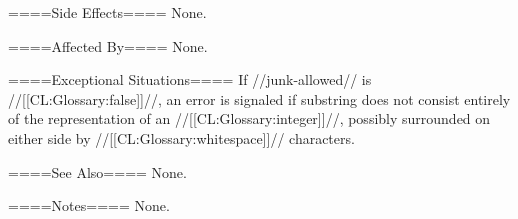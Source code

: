 ====Side Effects====
None.

====Affected By====
None.

====Exceptional Situations====
If //junk-allowed// is //[[CL:Glossary:false]]//, an error is signaled if substring does not consist entirely of the representation of an //[[CL:Glossary:integer]]//, possibly surrounded on either side by //[[CL:Glossary:whitespace]]// characters.

====See Also====
None.

====Notes====
None.

 
